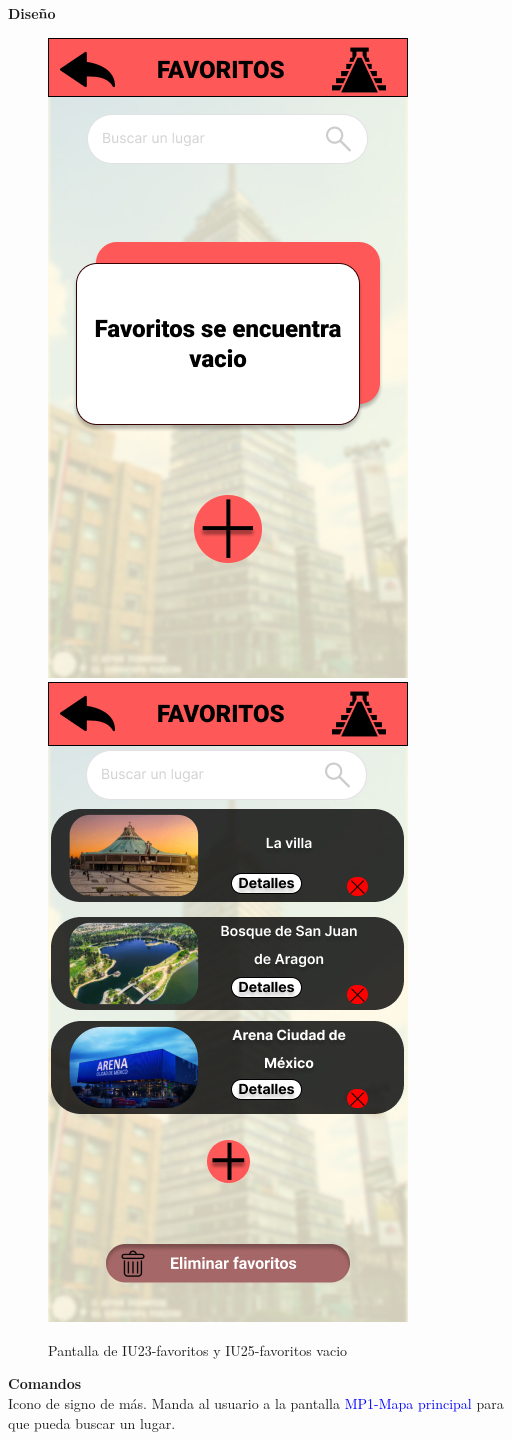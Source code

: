 \textbf{Diseño}
    \begin{figure}[h]
        
            \centering
            \includegraphics[width=.4\linewidth]{Pantallas Prototipo3/IU25 Pantalla Favoritos vacio.jpg}
            \includegraphics[width=.4\linewidth]{Pantallas Prototipo3/IU23 Pantalla Favoritos.jpg}
            \caption{Pantalla de IU23-favoritos y IU25-favoritos vacio}
    
    \end{figure}

\textbf{Comandos} \\
Icono de signo de más. Manda al usuario a la pantalla \textcolor{blue}{MP1-Mapa principal} para que pueda buscar un lugar.


